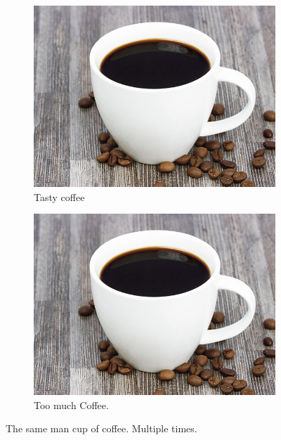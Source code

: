 \documentclass{article}
\begin{document}
\begin{figure}[h!]
\begin{subfigure}[b]{0.2\linewidth}
			\includegraphics[width=\linewidth]{coffee.jpg}
			\caption{Tasty coffee}
		\end{subfigure}
		\begin{subfigure}[b]{0.5\linewidth}
			\includegraphics[width=\linewidth]{coffee.jpg}
			\caption{Too much Coffee.}
		\end{subfigure}
		\caption{The same man cup of coffee. Multiple times.}
		\label{fig:coffee}
	\end{figure}
\end{document}
